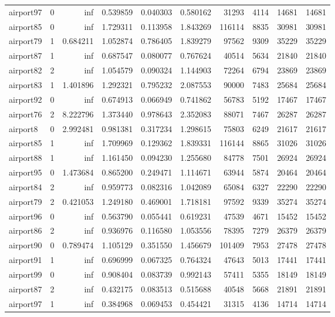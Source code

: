 \begin{longtable}{|l|r|r|r|r|r|r|r|r|r|}
airport97 & 0 & inf & 0.539859 & 0.040303 & 0.580162 & 31293 & 4114 & 14681 & 14681 \\
airport85 & 0 & inf & 1.729311 & 0.113958 & 1.843269 & 116114 & 8835 & 30981 & 30981 \\
airport79 & 1 & 0.684211 & 1.052874 & 0.786405 & 1.839279 & 97562 & 9309 & 35229 & 35229 \\
airport87 & 1 & inf & 0.687547 & 0.080077 & 0.767624 & 40514 & 5634 & 21840 & 21840 \\
airport82 & 2 & inf & 1.054579 & 0.090324 & 1.144903 & 72264 & 6794 & 23869 & 23869 \\
airport83 & 1 & 1.401896 & 1.292321 & 0.795232 & 2.087553 & 90000 & 7483 & 25684 & 25684 \\
airport92 & 0 & inf & 0.674913 & 0.066949 & 0.741862 & 56783 & 5192 & 17467 & 17467 \\
airport76 & 2 & 8.222796 & 1.373440 & 0.978643 & 2.352083 & 88071 & 7467 & 26287 & 26287 \\
airport8 & 0 & 2.992481 & 0.981381 & 0.317234 & 1.298615 & 75803 & 6249 & 21617 & 21617 \\
airport85 & 1 & inf & 1.709969 & 0.129362 & 1.839331 & 116144 & 8865 & 31026 & 31026 \\
airport88 & 1 & inf & 1.161450 & 0.094230 & 1.255680 & 84778 & 7501 & 26924 & 26924 \\
airport95 & 0 & 1.473684 & 0.865200 & 0.249471 & 1.114671 & 63944 & 5874 & 20464 & 20464 \\
airport84 & 2 & inf & 0.959773 & 0.082316 & 1.042089 & 65084 & 6327 & 22290 & 22290 \\
airport79 & 2 & 0.421053 & 1.249180 & 0.469001 & 1.718181 & 97592 & 9339 & 35274 & 35274 \\
airport96 & 0 & inf & 0.563790 & 0.055441 & 0.619231 & 47539 & 4671 & 15452 & 15452 \\
airport86 & 2 & inf & 0.936976 & 0.116580 & 1.053556 & 78395 & 7279 & 26379 & 26379 \\
airport90 & 0 & 0.789474 & 1.105129 & 0.351550 & 1.456679 & 101409 & 7953 & 27478 & 27478 \\
airport91 & 1 & inf & 0.696999 & 0.067325 & 0.764324 & 47643 & 5013 & 17441 & 17441 \\
airport99 & 0 & inf & 0.908404 & 0.083739 & 0.992143 & 57411 & 5355 & 18149 & 18149 \\
airport87 & 2 & inf & 0.432175 & 0.083513 & 0.515688 & 40548 & 5668 & 21891 & 21891 \\
airport97 & 1 & inf & 0.384968 & 0.069453 & 0.454421 & 31315 & 4136 & 14714 & 14714 \\

\end{longtable}
